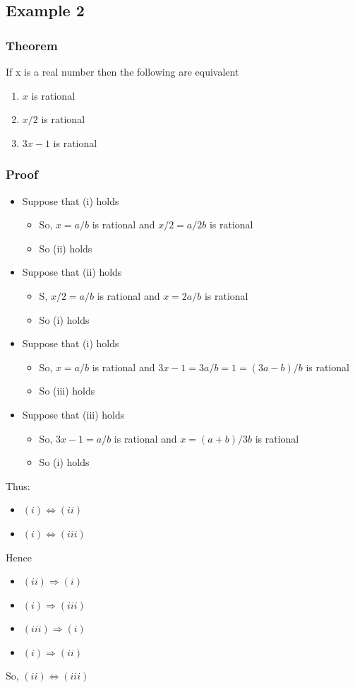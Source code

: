 \documentclass{article}[18pt]
\begin{document}
\subsection{Example 2}
\subsubsection{Theorem}
If x is a real number then the following are equivalent
\begin{enumerate}[label=(\roman*)]
	\item $x$ is rational
	\item $x/2$ is rational
	\item $3x-1$ is rational
\end{enumerate}
\subsubsection{Proof}
\begin{itemize}
	\item Suppose that (i) holds
	\begin{itemize}
		\item So, $x=a/b$ is rational and $x/2=a/2b$ is rational
		\item So (ii) holds
	\end{itemize}
	\item Suppose that (ii) holds
	\begin{itemize}
		\item S, $x/2=a/b$ is rational and $x=2a/b$ is rational
		\item So (i) holds
	\end{itemize}
	\item Suppose that (i) holds
	\begin{itemize}
		\item So, $x=a/b$ is rational and $3x-1=3a/b=1=(3a-b)/b$ is rational
		\item So (iii) holds
	\end{itemize}
	\item Suppose that (iii) holds
	\begin{itemize}
		\item So, $3x-1=a/b$ is rational and $x=(a+b)/3b$ is rational
		\item So (i) holds
	\end{itemize}
\end{itemize}
Thus:
\begin{itemize}
	\item $(i)\Leftrightarrow (ii)$
	\item $(i)\Leftrightarrow (iii)$
\end{itemize}
Hence
\begin{itemize}
	\item $(ii)\Rightarrow (i)$
	\item $(i)\Rightarrow (iii)$
	\item $(iii)\Rightarrow (i)$
	\item $(i)\Rightarrow (ii)$
\end{itemize}
So, $(ii)\Leftrightarrow(iii)$
\end{document}
